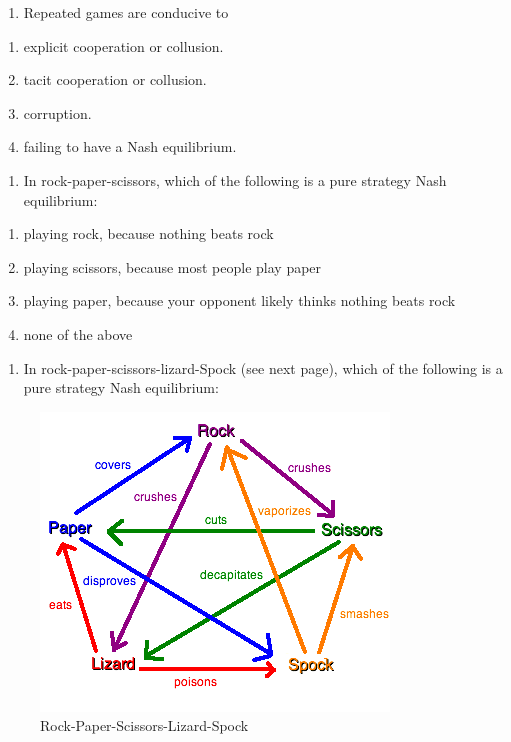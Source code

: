 \documentclass[11pt,]{article}
\providecommand{\tightlist}{%
  \setlength{\itemsep}{0pt}\setlength{\parskip}{0pt}}
\begin{document}
\begin{enumerate}
\def\labelenumi{\arabic{enumi})}
\setcounter{enumi}{23}
\tightlist
\item
  Repeated games are conducive to
\end{enumerate}

\begin{enumerate}
\def\labelenumi{\Alph{enumi})}
\tightlist
\item
  explicit cooperation or collusion.
\item
  tacit cooperation or collusion.
\item
  corruption.
\item
  failing to have a Nash equilibrium.
\end{enumerate}

\begin{enumerate}
\def\labelenumi{\arabic{enumi})}
\setcounter{enumi}{24}
\tightlist
\item
  In rock-paper-scissors, which of the following is a pure strategy Nash
  equilibrium:
\end{enumerate}

\begin{enumerate}
\def\labelenumi{\Alph{enumi})}
\tightlist
\item
  playing rock, because nothing beats rock
\item
  playing scissors, because most people play paper
\item
  playing paper, because your opponent likely thinks nothing beats rock
\item
  none of the above
\end{enumerate}

\begin{enumerate}
\def\labelenumi{\arabic{enumi})}
\setcounter{enumi}{24}
\tightlist
\item
  In rock-paper-scissors-lizard-Spock (see next page), which of the
  following is a pure strategy Nash equilibrium:
\end{enumerate}

\begin{figure}
\centering
\includegraphics{Rock_paper_scissors_lizard_spock.png}
\caption{Rock-Paper-Scissors-Lizard-Spock}
\end{figure}
\end{document}
